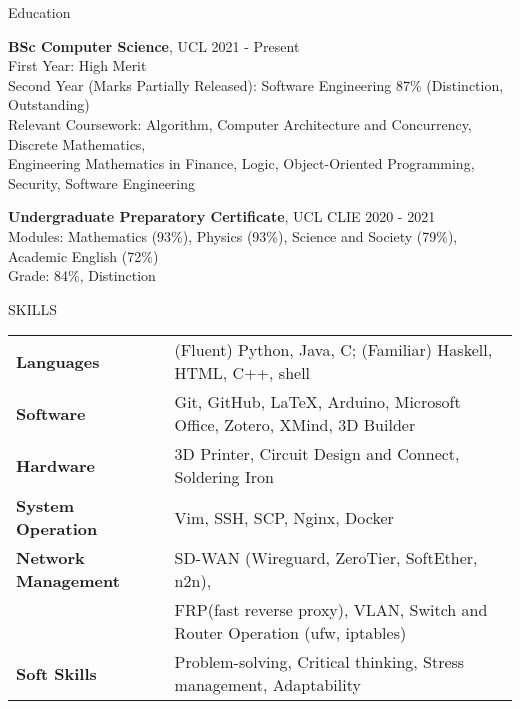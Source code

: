 \documentclass{resume} %
\begin{document}

\begin{rSection}{Education}

{\bf BSc Computer Science}, UCL \hfill {2021 - Present}\\
First Year: High Merit \\
Second Year (Marks Partially Released): Software Engineering 87\% (Distinction, Outstanding)\\
Relevant Coursework: Algorithm, Computer Architecture and Concurrency, Discrete Mathematics, \\
Engineering Mathematics in Finance, Logic, Object-Oriented Programming, Security, Software Engineering

{\bf Undergraduate Preparatory Certificate}, UCL CLIE \hfill {2020 - 2021}\\
Modules: Mathematics (93\%), Physics (93\%), Science and Society (79\%), Academic English (72\%)\\
Grade: 84\%, Distinction


\end{rSection}

\begin{rSection}{SKILLS}

\begin{tabular}{ @{} >{\bfseries}l @{\hspace{6ex}} l }
Languages & (Fluent) Python, Java, C; (Familiar) Haskell, HTML, C++, shell
\\
Software & Git, GitHub, \LaTeX, Arduino, Microsoft Office, Zotero, XMind, 3D Builder
\\
Hardware & 3D Printer, Circuit Design and Connect, Soldering Iron
\\
System Operation & Vim, SSH, SCP, Nginx, Docker
\\
Network Management & SD-WAN (Wireguard, ZeroTier, SoftEther, n2n), \\ 
& FRP(fast reverse proxy),
VLAN, Switch and Router Operation (ufw, iptables)\\
Soft Skills & Problem-solving, Critical thinking, Stress management, Adaptability
\end{tabular}
\end{rSection}
\end{document}

